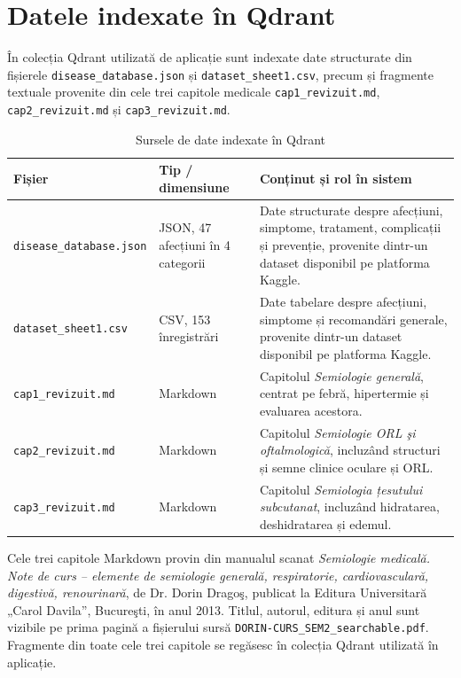 \documentclass[12pt, a4paper, oneside, romanian]{teza-upb}
\begin{document}
\section{Datele indexate în Qdrant}

În colecția Qdrant utilizată de aplicație sunt indexate date structurate din fișierele \texttt{disease\_database.json} și \texttt{dataset\_sheet1.csv}, precum și fragmente textuale provenite din cele trei capitole medicale \texttt{cap1\_revizuit.md}, \texttt{cap2\_revizuit.md} și \texttt{cap3\_revizuit.md}.

\begin{table}[H]
\centering
\caption{Sursele de date indexate în Qdrant}
\label{tab:surse-ingestie}
\small
\begin{tabular}{|p{4.2cm}|p{2.3cm}|p{6.5cm}|}
\hline
\textbf{Fișier} & \textbf{Tip / dimensiune} & \textbf{Conținut și rol în sistem} \\
\hline
\texttt{disease\_database.json} & JSON, 47 afecțiuni în 4 categorii & Date structurate despre afecțiuni, simptome, tratament, complicații și prevenție, provenite dintr-un dataset disponibil pe platforma Kaggle. \\
\hline
\texttt{dataset\_sheet1.csv} & CSV, 153 înregistrări & Date tabelare despre afecțiuni, simptome și recomandări generale, provenite dintr-un dataset disponibil pe platforma Kaggle. \\
\hline
\texttt{cap1\_revizuit.md} & Markdown & Capitolul \textit{Semiologie generală}, centrat pe febră, hipertermie și evaluarea acestora. \\
\hline
\texttt{cap2\_revizuit.md} & Markdown & Capitolul \textit{Semiologie ORL şi oftalmologică}, incluzând structuri și semne clinice oculare și ORL. \\
\hline
\texttt{cap3\_revizuit.md} & Markdown & Capitolul \textit{Semiologia țesutului subcutanat}, incluzând hidratarea, deshidratarea și edemul. \\
\hline
\end{tabular}
\end{table}

Cele trei capitole Markdown provin din manualul scanat \textit{Semiologie medicală. Note de curs -- elemente de semiologie generală, respiratorie, cardiovasculară, digestivă, renourinară}, de Dr. Dorin Dragoş, publicat la Editura Universitară „Carol Davila”, Bucureşti, în anul 2013. Titlul, autorul, editura și anul sunt vizibile pe prima pagină a fișierului sursă \texttt{DORIN-CURS\_SEM2\_searchable.pdf}. Fragmente din toate cele trei capitole se regăsesc în colecția Qdrant utilizată în aplicație.
\end{document}

